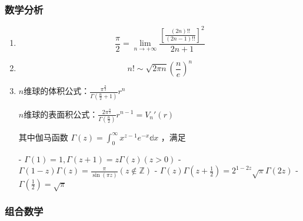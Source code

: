\subsubsection{数学分析}

\begin{enumerate}

\item

\begin{equation}
\frac{\pi}{2} = \lim_{n \to +\infty}\frac{[\frac{(2n)!!}{(2n-1)!!}]^{2}}{2n+1}
\end{equation}

\item

\begin{equation}
n!\sim\sqrt{2\pi n}(\frac{n}{e})^{n}
\end{equation}

\item $n$维球的体积公式：$\displaystyle{\frac{\pi^{\frac{n}{2}}}{\Gamma(\frac{n}{2}+1)}r^{n}}$

$n$维球的表面积公式：$\displaystyle{\frac{2\pi^{\frac{n}{2}}}{\Gamma(\frac{n}{2})}r^{n-1}=V_{n}'(r)}$

其中伽马函数 $\Gamma(z)=\int_{0}^{\infty}x^{z-1}e^{-x}\mathbb{d}x$ ，满足

 - $\Gamma(1)=1,\Gamma(z+1)=z\Gamma(z)(z>0)$
 - $\Gamma(1-z)\Gamma(z)=\frac{\pi}{\sin(\pi z)}(z\notin\mathbb{Z})$
 - $\Gamma(z)\Gamma(z+\frac{1}{2})=2^{1-2z}\sqrt{\pi}\Gamma(2z)$
 - $\Gamma(\frac{1}{2})=\sqrt{\pi}$

\end{enumerate}

\subsubsection{组合数学}

